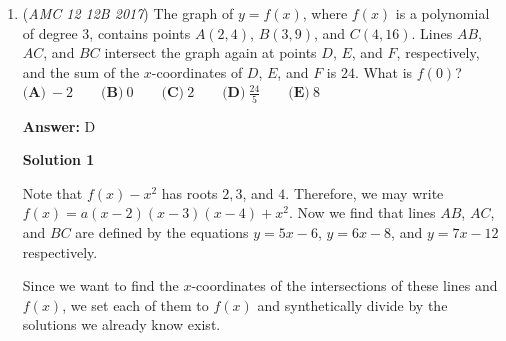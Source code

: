 \begin{enumerate}
\begin{verbatim}
Case 4: $(4,5,3,4)$The probability of $(4,5,3,4)$ occurring after the second round is $\frac{1}{3}$.The probability of $(3,5,4,4)$ occurring after $(4,5,3,4)$ is $\frac{1}{3}$.$\frac{1}{3} \cdot \frac{1}{3} = \frac{1}{9}$
\end{verbatim}

\begin{verbatim}
Case 5: $(3,6,3,4)$The probability of $(3,6,3,4)$ occurring after the second round is $\frac{1}{6}$.The probability of $(3,5,4,4)$ occurring after $(3,6,3,4)$ is $\frac{1}{6}$.$\frac{1}{6} \cdot \frac{1}{6} = \frac{1}{36}$
\end{verbatim}

\begin{verbatim}
Case 6: $(3,5,3,5)$The probability of $(3,5,3,5)$ occurring after the second round is $\frac{1}{6}$.The probability of $(3,5,4,4)$ occurring after $(3,5,3,5)$ is $\frac{1}{3}$.$\frac{1}{6} \cdot \frac{1}{3} = \frac{1}{18}$
\end{verbatim}

The probability that at the end of the fourth round the arrangement is $(4,4,4,4)$ is
 \[\frac{1}{12} \left( \frac{1}{144} + \frac{1}{12} + \frac{1}{36} + \frac19 + \frac{1}{36} + \frac{1}{18} \right) = \boxed{\textbf{(B)}\frac{5}{192}}\]



	\item (\textit{AMC 12 12B 2017}) The graph of $y=f(x)$, where $f(x)$ is a polynomial of degree $3$, contains points $A(2,4)$, $B(3,9)$, and $C(4,16)$. Lines $AB$, $AC$, and $BC$ intersect the graph again at points $D$, $E$, and $F$, respectively, and the sum of the $x$-coordinates of $D$, $E$, and $F$ is $24$. What is $f(0)$?
$\textbf{(A)}\ -2 \qquad \textbf{(B)}\ 0 \qquad \textbf{(C)}\ 2 \qquad \textbf{(D)}\ \frac{24}{5} \qquad\textbf{(E)}\ 8$

 \textbf{Answer: }D



\textbf{Solution 1}

Note that $f(x) - x^2$ has roots $2, 3$, and $4$. Therefore, we may write $f(x) = a(x-2)(x-3)(x-4) +x^2$. Now we find that lines $AB$, $AC$, and $BC$ are defined by the equations $y = 5x - 6$, $y= 6x-8$, and $y=7x-12$ respectively. 

 Since we want to find the $x$-coordinates of the intersections of these lines and $f(x)$, we set each of them to $f(x)$ and synthetically divide by the solutions we already know exist. 


\end{enumerate}
